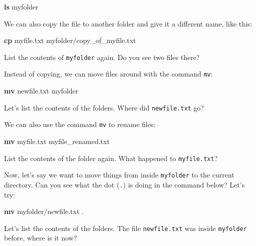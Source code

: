 \documentclass[
]{book}
\newenvironment{Shaded}{\begin{snugshade}}{\end{snugshade}}
\newcommand{\FunctionTok}[1]{\textcolor[rgb]{0.13,0.29,0.53}{\textbf{#1}}}
\newcommand{\NormalTok}[1]{#1}
\begin{document}
\begin{Shaded}
\begin{Highlighting}[]
\FunctionTok{ls}\NormalTok{ myfolder}
\end{Highlighting}
\end{Shaded}

We can also copy the file to another folder and give it a different name, like this:

\begin{Shaded}
\begin{Highlighting}[]
\FunctionTok{cp}\NormalTok{ myfile.txt myfolder/copy\_of\_myfile.txt}
\end{Highlighting}
\end{Shaded}

List the contents of \texttt{myfolder} again. Do you see two files there?

Instead of copying, we can move files around with the command \texttt{mv}:

\begin{Shaded}
\begin{Highlighting}[]
\FunctionTok{mv}\NormalTok{ newfile.txt myfolder}
\end{Highlighting}
\end{Shaded}

Let's list the contents of the folders. Where did \texttt{newfile.txt} go?

We can also use the command \texttt{mv} to rename files:

\begin{Shaded}
\begin{Highlighting}[]
\FunctionTok{mv}\NormalTok{ myfile.txt myfile\_renamed.txt}
\end{Highlighting}
\end{Shaded}

List the contents of the folder again. What happened to \texttt{myfile.txt}?

Now, let's say we want to move things from inside \texttt{myfolder} to the current directory. Can you see what the dot (\texttt{.}) is doing in the command below? Let's try:

\begin{Shaded}
\begin{Highlighting}[]
\FunctionTok{mv}\NormalTok{ myfolder/newfile.txt .}
\end{Highlighting}
\end{Shaded}

Let's list the contents of the folders. The file \texttt{newfile.txt} was inside \texttt{myfolder} before, where is it now?
\end{document}
